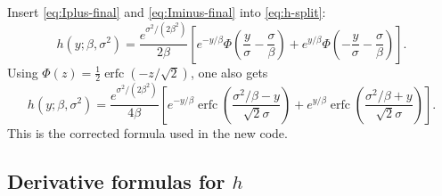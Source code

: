 \documentclass[11pt,a4paper]{article}
\newcommand{\PhiN}{\Phi}
\begin{document}
Insert \eqref{eq:Iplus-final} and \eqref{eq:Iminus-final} into \eqref{eq:h-split}:
\begin{equation}
h(y;\beta,\sigma^2)
=
\frac{e^{\sigma^2/(2\beta^2)}}{2\beta}
\left[
 e^{-y/\beta}\PhiN\!\left(\frac{y}{\sigma}-\frac{\sigma}{\beta}\right)
 +
 e^{y/\beta}\PhiN\!\left(-\frac{y}{\sigma}-\frac{\sigma}{\beta}\right)
\right].
\label{eq:h-final}
\end{equation}
Using $\PhiN(z)=\frac12 \operatorname{erfc}(-z/\sqrt{2})$, one also gets
\begin{equation}
h(y;\beta,\sigma^2)
=
\frac{e^{\sigma^2/(2\beta^2)}}{4\beta}
\left[
 e^{-y/\beta}\operatorname{erfc}\!\left(\frac{\sigma^2/\beta-y}{\sqrt{2}\sigma}\right)
 +
 e^{y/\beta}\operatorname{erfc}\!\left(\frac{\sigma^2/\beta+y}{\sqrt{2}\sigma}\right)
\right].
\label{eq:h-erfc}
\end{equation}
This is the corrected formula used in the new code.

\subsection[Derivative formulas for h]{Derivative formulas for $h$}
\end{document}
